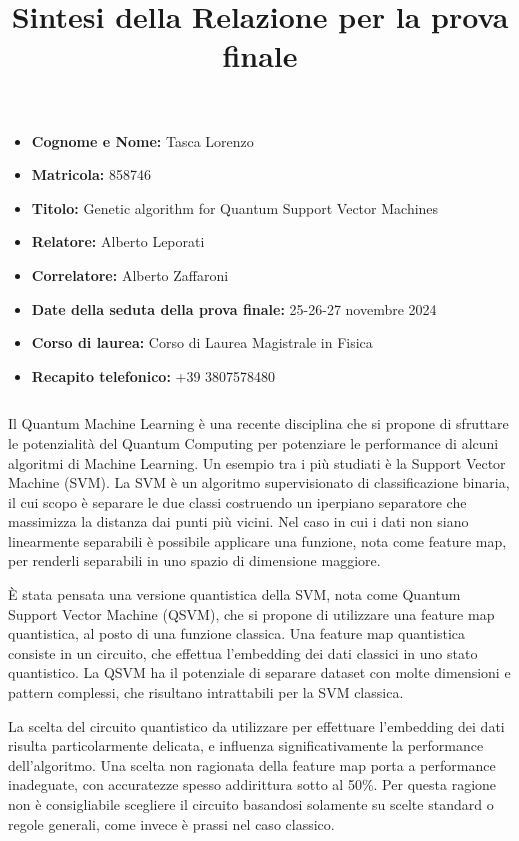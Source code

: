 \documentclass{article}
\title{Sintesi della Relazione per la prova finale}
\date{}
\author{}
\begin{document}


\begin{itemize}
   \item \textbf{Cognome e Nome:} Tasca Lorenzo
    \item \textbf{Matricola:} 858746
    \item \textbf{Titolo:} Genetic algorithm for Quantum Support Vector Machines    \item \textbf{Relatore:} Alberto Leporati
    \item \textbf{Correlatore:} Alberto Zaffaroni
    \item \textbf{Date della seduta della prova finale:} 25-26-27 novembre 2024 
  \item \textbf{Corso di laurea:} Corso di Laurea Magistrale in Fisica
    \item \textbf{Recapito telefonico:} +39 3807578480
    
\end{itemize}

$\,$

Il Quantum Machine Learning è una recente disciplina che si propone di sfruttare le potenzialità del Quantum Computing per potenziare le performance di alcuni algoritmi di Machine Learning. Un esempio tra i più studiati è la Support Vector Machine (SVM). La SVM è un algoritmo supervisionato di classificazione binaria, il cui scopo è separare le due classi costruendo un iperpiano separatore che massimizza la distanza dai punti più vicini. Nel caso in cui i dati non siano linearmente separabili è possibile applicare una funzione, nota come feature map, per renderli separabili in uno spazio di dimensione maggiore. 

È stata pensata una versione quantistica della SVM, nota come Quantum Support Vector Machine (QSVM), che si propone di utilizzare una feature map quantistica, al posto di una funzione classica. Una feature map quantistica consiste in un circuito, che effettua l'embedding dei dati classici in uno stato quantistico. La QSVM ha il potenziale di separare dataset con molte dimensioni e pattern complessi, che risultano intrattabili per la SVM classica. 

La scelta del circuito quantistico da utilizzare per effettuare l'embedding dei dati risulta particolarmente delicata, e influenza significativamente la performance dell'algoritmo. Una scelta non ragionata della feature map porta a performance inadeguate, con accuratezze spesso addirittura sotto al 50\%. Per questa ragione non è consigliabile scegliere il circuito basandosi solamente su scelte standard o regole generali, come invece è prassi nel caso classico.
\end{document}
